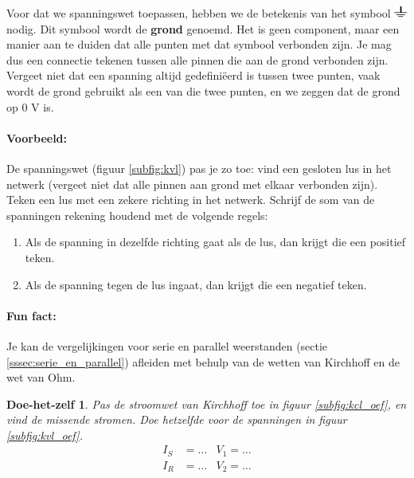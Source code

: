 \documentclass{article}
\newtheorem{DIY}{Doe-het-zelf}
\begin{document}
			Voor dat we spanningswet toepassen, hebben we de betekenis van het symbool \includegraphics[height=1em]{gnd.pdf} nodig. Dit symbool wordt de \textbf{grond} genoemd. Het is geen component, maar een manier aan te duiden dat alle punten met dat symbool verbonden zijn. Je mag dus een connectie tekenen tussen alle pinnen die aan de grond verbonden zijn. Vergeet niet dat een spanning altijd gedefini\"eerd is tussen twee punten, vaak wordt de grond gebruikt als een van die twee punten, en we zeggen dat de grond op 0 V is.

			\paragraph*{Voorbeeld:} De spanningswet (figuur \ref{subfig:kvl}) pas je zo toe: vind een gesloten lus in het netwerk (vergeet niet dat alle pinnen aan grond met elkaar verbonden zijn). Teken een lus met een zekere richting in het netwerk. Schrijf de som van de spanningen rekening houdend met de volgende regels:

			\begin{enumerate}
			 	\item Als de spanning in dezelfde richting gaat als de lus, dan krijgt die een positief teken.
			 	\item Als de spanning tegen de lus ingaat, dan krijgt die een negatief teken.
			 \end{enumerate}

			\paragraph*{Fun fact:} Je kan de vergelijkingen voor serie en parallel weerstanden (sectie \ref{sssec:serie_en_parallel}) afleiden met behulp van de wetten van Kirchhoff en de wet van Ohm.

			\begin{DIY} Pas de stroomwet van Kirchhoff toe in figuur \ref{subfig:kcl_oef}, en vind de missende stromen. Doe hetzelfde voor de spanningen in figuur \ref{subfig:kvl_oef}.
			\begin{align*}
			    I_S &= \ldots & V_1 = \ldots\\
			    I_R &= \ldots & V_2 = \ldots
			\end{align*}
			\end{DIY}
\end{document}
